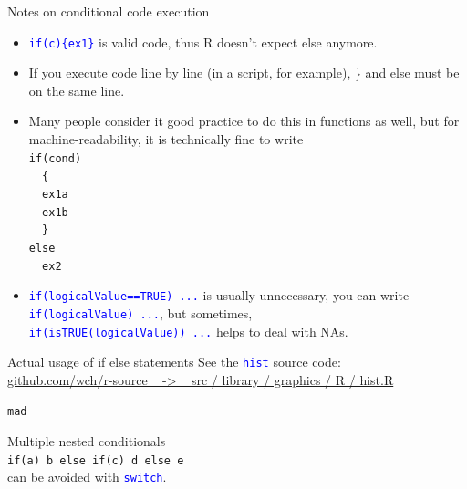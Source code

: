 \documentclass[xcolor=table,       handout,    xcolor=dvipsnames]{beamer}\usepackage[]{graphicx}\usepackage[]{color}
\makeatletter
\newcommand{\hlstd}[1]{\textcolor[rgb]{0,0,0}{#1}}
\newenvironment{kframe}{%
 \def\at@end@of@kframe{}%
 \ifinner\ifhmode%
  \def\at@end@of@kframe{\end{minipage}}%
  \begin{minipage}{\columnwidth}%
 \fi\fi%
 \def\FrameCommand##1{\hskip\@totalleftmargin \hskip-\fboxsep
 \colorbox{shadecolor}{##1}\hskip-\fboxsep
     \hskip-\linewidth \hskip-\@totalleftmargin \hskip\columnwidth}%
 \MakeFramed {\advance\hsize-\width
   \@totalleftmargin\z@ \linewidth\hsize
   \@setminipage}}%
 {\par\unskip\endMakeFramed%
 \at@end@of@kframe}
\newenvironment{knitrout}{}{} %
\newcommand{\rcode}[1]{\texttt{\textcolor{Blue}{#1}}} %
\makeatother
\begin{document}

\begin{frame}[fragile]{Notes on conditional code execution}
\begin{itemize}[<+->]
\item \rcode{\alert{if}(c)\{ex1\}} is valid code, thus R doesn't expect \alert{else} anymore.
\item If you execute code line by line (in a script, for example), \alert{\}} and \alert{else} must be on the same line.
\item Many people consider it good practice to do this in functions as well, but for machine-readability, it is technically fine to write\\
\texttt{\alert{if}(cond)\\
~~\{\\
~~ex1a\\
~~ex1b\\
~~\} \\
\alert{else}\\
~~ex2}
\item \rcode{\alert{if}(logicalValue==TRUE) ...} is usually unnecessary, you can write\\
\onslide<+-> \rcode{\alert{if}(logicalValue) ...}, but sometimes,\\
\onslide<+->  \rcode{\alert{if}(isTRUE(logicalValue)) ...} helps to deal with NAs.
\end{itemize}
\end{frame}


\begin{frame}{Actual usage of if else statements}
See the \rcode{hist} source code: \\
\href{https://github.com/wch/r-source/blob/trunk/src/library/graphics/R/hist.R}{github.com/wch/r-source ~ -> ~ src / library / graphics / R / hist.R}\\[1em]
\pause
\begin{knitrout}
\color{fgcolor}\begin{kframe}
\begin{alltt}
\hlstd{mad}
\end{alltt}
\end{kframe}
\end{knitrout}
\pause
Multiple nested conditionals\\
\texttt{\alert{if}(a) b \alert{else} \alert{if}(c) d \alert{else} e}\\
can be avoided with \rcode{switch}.
\end{frame}
\end{document}
